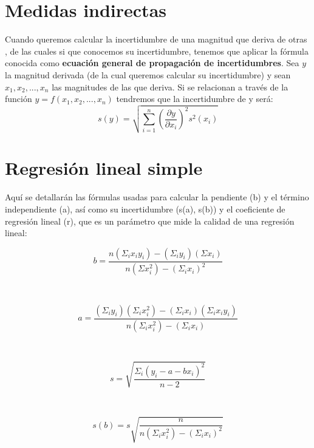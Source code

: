 \documentclass[12pt,a4paper]{book}
\begin{document}
\section{Medidas indirectas}
Cuando queremos calcular la incertidumbre de una magnitud que deriva de otras , de las cuales si que conocemos su incertidumbre, tenemos que aplicar la fórmula conocida como \textbf{ecuación general de propagación de incertidumbres}. Sea $y$ la magnitud derivada (de la cual queremos calcular su incertidumbre) y sean $x_1, x_2, ..., x_n$ las magnitudes de las que deriva. Si se relacionan a través de la función $y=f(x_1, x_2,...,x_n)$ tendremos que la incertidumbre de y será:
\begin{equation}
s(y)= \sqrt{ \sum_{i=1}^{n} (\dfrac{\partial y}{\partial x_i})^2 s^2(x_i)}
\end{equation}
\section{Regresión lineal simple}\label{Sec:regresión-lineal-simple}
Aquí se detallarán las fórmulas usadas para calcular la pendiente (b) y el término independiente (a), así como su incertidumbre (s(a), s(b)) y el coeficiente de regresión lineal (r), que es un parámetro que mide la calidad de una regresión lineal:

\begin{equation}
b=\dfrac{n(\Sigma_i x_i y_i)-(\Sigma_i y_i)(\Sigma x_i)}{n(\Sigma x_i^2) -(\Sigma_i x_i)^2}
\label{Ec: ecuación de b regresión lineal simple}
\end{equation}

$ $

\begin{equation}
a=\dfrac{ (\Sigma_i y_i)(\Sigma_i x_i^2)- (\Sigma_i x_i)(\Sigma_i x_iy_i)}{n(\Sigma_i x_i^2)-(\Sigma_i x_i)}
\label{Ec: ecuacion de a regresión lineal simple}
\end{equation}

$ $

\begin{equation}
s=\sqrt{\dfrac{\Sigma_i (y_i-a-bx_i)^2}{n-2}}
\label{Ec: desviación típica del ajuste regresión lineal simple}
\end{equation}

$ $

\begin{equation}
s(b)=s \sqrt{\dfrac{n}{n(\Sigma_i x_i^2)-(\Sigma_i x_i)^2}}
\label{Ec: ecuación incertidumbre de b regresion lineal simple}
\end{equation}
\end{document}
